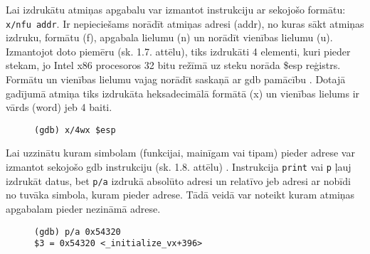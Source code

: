 Lai izdrukātu atmiņas apgabalu var izmantot instrukciju ar sekojošo formātu: \texttt{x/nfu addr}. 
Ir nepieciešams norādīt atmiņas adresi (addr), no kuras sākt atmiņas izdruku, formātu (f), apgabala lielumu (n) un norādīt vienības lielumu (u). 
Izmantojot doto piemēru (sk. 1.7. attēlu), tiks izdrukāti 4 elementi, kuri pieder stekam, jo Intel x86 procesoros 32 bitu režīmā uz steku norāda \$esp reģistrs. 
Formātu un vienības lielumu vajag norādīt saskaņā ar gdb pamācību \cite{gdb}. 
Dotajā gadījumā atmiņa tiks izdrukāta heksadecimālā formātā (x) un vienības lielums ir vārds (word) jeb 4 baiti.
\begin{figure}[h]
\begin{lstlisting}[style=customgdb]
(gdb) x/4wx $esp
\end{lstlisting}
\caption{\textbf{\fontsize{11}{12}\selectfont {Atmiņas apgabala izdrukāšana}}}
\end{figure}

Lai uzzinātu kuram simbolam (funkcijai, mainīgam vai tipam) pieder adrese var izmantot sekojošo gdb instrukciju (sk. 1.8. attēlu) \cite{gdb}.
Instrukcija \texttt{print} vai \texttt{p} ļauj izdrukāt datus, bet \texttt{p/a} izdrukā absolūto adresi un relatīvo jeb adresi ar nobīdi no tuvāka simbola, kuram pieder adrese.
Tādā veidā var noteikt kuram atmiņas apgabalam pieder nezināmā adrese.
\begin{figure}[h]
\begin{lstlisting}[style=customgdb]
(gdb) p/a 0x54320
$3 = 0x54320 <_initialize_vx+396>
\end{lstlisting}
\caption{\textbf{\fontsize{11}{12}\selectfont {Noteikšana, kuram simbolam pieder adrese}}}
\end{figure}

